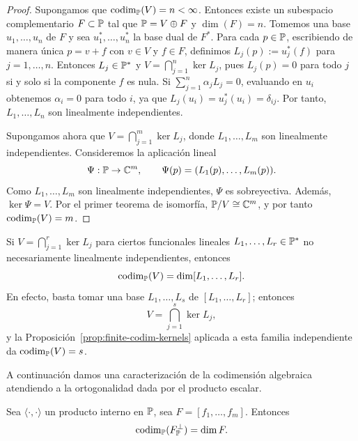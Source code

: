 \begin{proof}
	Supongamos que $\operatorname{codim}_{\mathbb{P}}(V)=n<\infty$. Entonces existe un subespacio complementario $F\subset\mathbb{P}$ tal que $\mathbb{P}=V\oplus F$ y $\dim(F)=n$.
	Tomemos una base $u_1,\dots,u_n$ de $F$ y sea $u_1^*,\dots,u_n^*$ la base dual de $F^*$. Para cada $p\in\mathbb{P}$, escribiendo de manera única $p=v+f$ con $v\in V$ y $f\in F$, definimos $L_j(p):=u_j^*(f)$ para $j=1,\dots,n$. Entonces $L_j\in\mathbb{P}^*$ y $V=\bigcap_{j=1}^n\ker L_j$, pues $L_j(p)=0$ para todo $j$ si y solo si la componente $f$ es nula.
	Si $\sum_{j=1}^n \alpha_jL_j=0$, evaluando en $u_i$ obtenemos $\alpha_i=0$ para todo $i$, ya que $L_j(u_i)=u_j^*(u_i)=\delta_{ij}$. Por tanto, $L_1,\dots,L_n$ son linealmente independientes.

	Supongamos ahora que $V=\bigcap_{j=1}^m\ker L_j$, donde $L_1,\dots,L_m$ son linealmente independientes. Consideremos la aplicación lineal
	\[
		\Psi:\mathbb{P}\to\mathbb C^m,
		\qquad
		\Psi(p)=(L_1(p),\dots,L_m(p)).
	\]
	Como $L_1,\dots,L_m$ son linealmente independientes, $\Psi$ es sobreyectiva. Además, $\ker\Psi=V$. Por el primer teorema de isomorfía, $\mathbb{P}/V\cong\mathbb C^m$, y por tanto $\operatorname{codim}_{\mathbb{P}}(V)=m$.
\end{proof}

\begin{rmk}
	Si $V=\bigcap_{j=1}^r\ker L_j$ para ciertos funcionales lineales $L_1,\dots,L_r\in\mathbb{P}^*$ no necesariamente linealmente independientes, entonces
	\[
		\operatorname{codim}_{\mathbb{P}}(V)=\dim[L_1,\dots,L_r].
	\]
	En efecto, basta tomar una base $L_1,\dots,L_s$ de $[L_1,\dots,L_r]$; entonces
	\[
		V=\bigcap_{j=1}^s\ker L_j,
	\]
	y la Proposición~\ref{prop:finite-codim-kernels} aplicada a esta familia independiente da $\operatorname{codim}_{\mathbb{P}}(V)=s$.
\end{rmk}

A continuación damos una caracterización de la codimensión algebraica atendiendo a la ortogonalidad dada por el producto escalar.

\begin{prop}\label{prop:equiv_ortho_interseccion}
	Sea $\langle\cdot,\cdot\rangle$ un producto interno en $\mathbb{P}$, sea $F=[f_1,\dots,f_m]$.  Entonces
	\[
		\operatorname{codim}_{\mathbb{P}}(F^{\perp}_{\mathbb{P}})
		=
		\dim F.
	\]
\end{prop}

